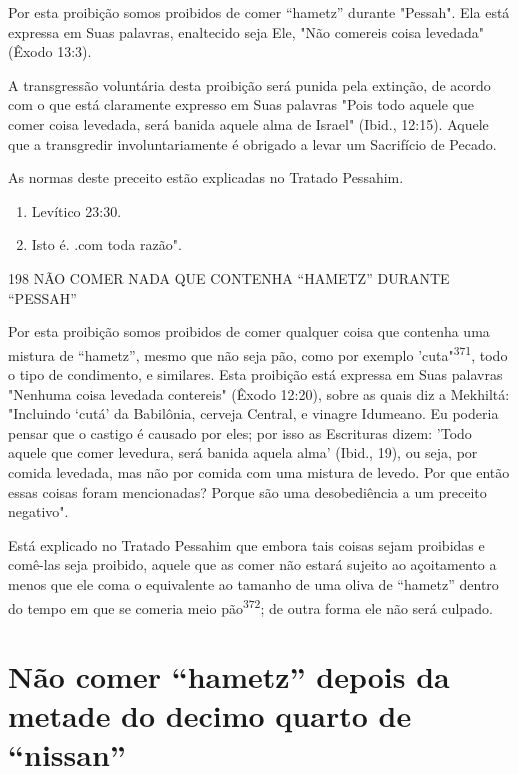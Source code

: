 Por esta proibição somos proibidos de comer ``hametz'' durante "Pes­sah".
Ela está expressa em Suas palavras, enaltecido seja Ele, "Não comereis
coisa levedada" (Êxodo 13:3).

A transgressão voluntária desta proibição será punida pela extinção, de
acordo com o que está claramente expresso em Suas palavras "Pois todo
aquele que comer coisa levedada, será banida aquele alma de Israel"
(Ibid., 12:15). Aquele que a transgredir involuntariamente é obrigado a
levar um Sa­crifício de Pecado.


As normas deste preceito estão explicadas no Tratado Pessahim.

\begin{enumerate}
\def\labelenumi{\arabic{enumi}.}
\setcounter{enumi}{368}
\item
 
 Levítico 23:30.
 
\item
 
 Isto é. .com toda razão".
 
\end{enumerate}

198 NÃO COMER NADA QUE CONTENHA ``HAMETZ'' DURANTE ``PESSAH''

Por esta proibição somos proibidos de comer qualquer coisa que con­tenha
uma mistura de ``hametz'', mesmo que não seja pão, como por exemplo
'cuta"\textsuperscript{371}, todo o tipo de condimento, e similares.
Esta proibição está expres­sa em Suas palavras "Nenhuma coisa levedada
contereis" (Êxodo 12:20), sobre as quais diz a Mekhiltá: "Incluindo
`cutá' da Babilônia, cerveja Central, e vina­gre Idumeano. Eu poderia
pensar que o castigo é causado por eles; por isso as Escrituras dizem:
'Todo aquele que comer levedura, será banida aquela al­ma' (Ibid., 19),
ou seja, por comida levedada, mas não por comida com uma mistura de
levedo. Por que então essas coisas foram mencionadas? Porque são uma
desobediência a um preceito negativo".

Está explicado no Tratado Pessahim que embora tais coisas sejam
proibidas e comê-las seja proibido, aquele que as comer não estará
sujeito ao açoitamento a menos que ele coma o equivalente ao tamanho de
uma oliva de ``hametz'' dentro do tempo em que se comeria meio
pão\textsuperscript{372}; de outra forma ele não será culpado.

\section{Não comer ``hametz'' depois da metade do decimo quarto de ``nissan''}

